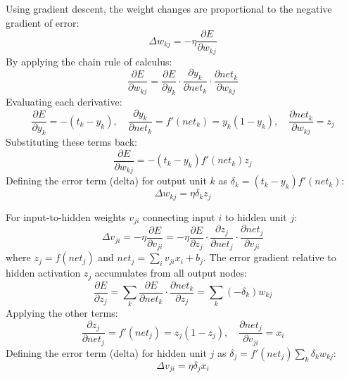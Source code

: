 \documentclass[12pt,a4paper]{article}
\begin{document}
\par\noindent
Using gradient descent, the weight changes are proportional to the negative gradient of error:
\begin{equation}
  \Delta w_{kj} = -\eta \frac{\partial E}{\partial w_{kj}}
\end{equation}
By applying the chain rule of calculus:
\begin{equation}
  \frac{\partial E}{\partial w_{kj}} = \frac{\partial E}{\partial y_k} \cdot \frac{\partial y_k}{\partial net_k} \cdot \frac{\partial net_k}{\partial w_{kj}}
\end{equation}
Evaluating each derivative:
\begin{equation*}
  \frac{\partial E}{\partial y_k} = -(t_k - y_k), \quad \frac{\partial y_k}{\partial net_k} = f'(net_k) = y_k(1 - y_k), \quad \frac{\partial net_k}{\partial w_{kj}} = z_j
\end{equation*}
Substituting these terms back:
\begin{equation}
  \frac{\partial E}{\partial w_{kj}} = -(t_k - y_k) f'(net_k) z_j
\end{equation}
Defining the error term (delta) for output unit $k$ as $\delta_k = (t_k - y_k) f'(net_k)$:
\begin{equation}
  \Delta w_{kj} = \eta \delta_k z_j
\end{equation}

\par\noindent
For input-to-hidden weights $v_{ji}$ connecting input $i$ to hidden unit $j$:
\begin{equation}
  \Delta v_{ji} = -\eta \frac{\partial E}{\partial v_{ji}} = -\eta \frac{\partial E}{\partial z_j} \cdot \frac{\partial z_j}{\partial net_j} \cdot \frac{\partial net_j}{\partial v_{ji}}
\end{equation}
where $z_j = f(net_j)$ and $net_j = \sum_i v_{ji} x_i + b_j$.
The error gradient relative to hidden activation $z_j$ accumulates from all output nodes:
\begin{equation*}
  \frac{\partial E}{\partial z_j} = \sum_k \frac{\partial E}{\partial net_k} \cdot \frac{\partial net_k}{\partial z_j} = \sum_k (-\delta_k) w_{kj}
\end{equation*}
Applying the other terms:
\begin{equation*}
  \frac{\partial z_j}{\partial net_j} = f'(net_j) = z_j(1 - z_j), \quad \frac{\partial net_j}{\partial v_{ji}} = x_i
\end{equation*}
Defining the error term (delta) for hidden unit $j$ as $\delta_j = f'(net_j) \sum_k \delta_k w_{kj}$:
\begin{equation}
  \Delta v_{ji} = \eta \delta_j x_i
\end{equation}
\end{document}
